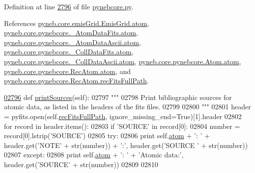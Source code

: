 Definition at line \hyperlink{pynebcore_8py_source_l02796}{2796} of file \hyperlink{pynebcore_8py_source}{pynebcore.\+py}.



References \hyperlink{emis_grid_8py_source_l00048}{pyneb.\+core.\+emis\+Grid.\+Emis\+Grid.\+atom}, \hyperlink{pynebcore_8py_source_l00082}{pyneb.\+core.\+pynebcore.\+\_\+\+Atom\+Data\+Fits.\+atom}, \hyperlink{pynebcore_8py_source_l00303}{pyneb.\+core.\+pynebcore.\+\_\+\+Atom\+Data\+Ascii.\+atom}, \hyperlink{pynebcore_8py_source_l00559}{pyneb.\+core.\+pynebcore.\+\_\+\+Coll\+Data\+Fits.\+atom}, \hyperlink{pynebcore_8py_source_l00909}{pyneb.\+core.\+pynebcore.\+\_\+\+Coll\+Data\+Ascii.\+atom}, \hyperlink{pynebcore_8py_source_l01164}{pyneb.\+core.\+pynebcore.\+Atom.\+atom}, \hyperlink{pynebcore_8py_source_l02564}{pyneb.\+core.\+pynebcore.\+Rec\+Atom.\+atom}, and \hyperlink{pynebcore_8py_source_l02648}{pyneb.\+core.\+pynebcore.\+Rec\+Atom.\+rec\+Fits\+Full\+Path}.


\begin{DoxyCode}
\hypertarget{classpyneb_1_1core_1_1pynebcore_1_1_rec_atom_l02796}{}\hyperlink{classpyneb_1_1core_1_1pynebcore_1_1_rec_atom_a0f7e0f80b7e0057d59d61676ff5a54c0}{02796}     \textcolor{keyword}{def }\hyperlink{classpyneb_1_1core_1_1pynebcore_1_1_rec_atom_a0f7e0f80b7e0057d59d61676ff5a54c0}{printSources}(self):
02797         \textcolor{stringliteral}{"""}
02798 \textcolor{stringliteral}{        Print bibliographic sources for atomic data, as listed in the headers of the fits files.}
02799 \textcolor{stringliteral}{        }
02800 \textcolor{stringliteral}{        """}       
02801         header = pyfits.open(self.\hyperlink{classpyneb_1_1core_1_1pynebcore_1_1_rec_atom_af74fe68ebe037be119ac2f136485782b}{recFitsFullPath}, ignore\_missing\_end=\textcolor{keyword}{True})[1].header
02802         \textcolor{keywordflow}{for} record \textcolor{keywordflow}{in} header.items():
02803             \textcolor{keywordflow}{if} \textcolor{stringliteral}{'SOURCE'} \textcolor{keywordflow}{in} record[0]:
02804                 number = record[0].lstrip(\textcolor{stringliteral}{'SOURCE'})
02805                 \textcolor{keywordflow}{try}:
02806                     \textcolor{keywordflow}{print} self.\hyperlink{classpyneb_1_1core_1_1pynebcore_1_1_rec_atom_a1a2aa175da6b5b8847f409e37437e3d3}{atom} + \textcolor{stringliteral}{': '} + header.get(\textcolor{stringliteral}{'NOTE'} + str(number)) + \textcolor{stringliteral}{':'}, header.get(\textcolor{stringliteral}{'SOURCE
      '} + str(number))
02807                 \textcolor{keywordflow}{except}:
02808                     \textcolor{keywordflow}{print} self.\hyperlink{classpyneb_1_1core_1_1pynebcore_1_1_rec_atom_a1a2aa175da6b5b8847f409e37437e3d3}{atom} + \textcolor{stringliteral}{': '} + \textcolor{stringliteral}{'Atomic data:'}, header.get(\textcolor{stringliteral}{'SOURCE'} + str(number))
02809 
02810 
\end{DoxyCode}
\hypertarget{classpyneb_1_1core_1_1pynebcore_1_1_rec_atom_acdf8a7cf94fee8be8335e4651c318a30}{}
